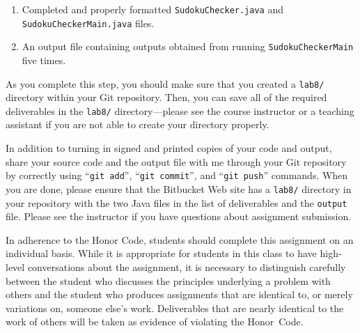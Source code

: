 \vspace{-0.05in}
\begin{enumerate}
    \setlength{\itemsep}{0pt}
  \item Completed and properly formatted {\tt SudokuChecker.java} and {\tt SudokuCheckerMain.java} files.

  \item An output file containing outputs obtained from running {\tt SudokuCheckerMain} five times.
        
\end{enumerate}
\vspace{-0.05in}

\noindent As you complete this step, you should make sure that you created a {\tt lab8/} directory within your Git
repository.  Then, you can save all of the required deliverables in the {\tt lab8/} directory---please see the course
instructor or a teaching assistant if you are not able to create your directory properly. 

\noindent In addition to turning in signed and printed copies of your code and output, share your source code and the output
file with me through your Git repository by correctly using ``{\tt git add}'', ``{\tt git commit}'', and ``{\tt git
  push}'' commands. When you are done, please ensure that the Bitbucket Web site has a {\tt lab8/} directory in your
repository with the two Java files in the list of deliverables and the {\tt output} file. Please see the instructor
if you have questions about assignment submission.


In adherence to the Honor Code, students should complete this assignment on an individual basis. While it is appropriate
for students in this class to have high-level conversations about the assignment, it is necessary to distinguish
carefully between the student who discusses the principles underlying a problem with others and the student who produces
assignments that are identical to, or merely variations on, someone else's work.  Deliverables that are nearly identical
to the work of others will be taken as evidence of violating the \mbox{Honor Code}.  



